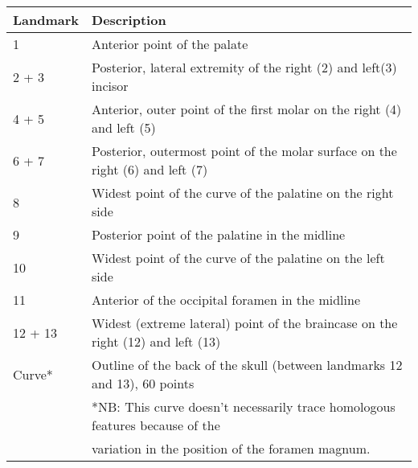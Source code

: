 \begin{tabular}[t]{l l}		
\hline
\textbf{Landmark} & \textbf{Description} \\
\hline
1 & Anterior point of the palate\\
2 + 3 & Posterior, lateral extremity of the right (2) and left(3) incisor\\
4 + 5 & Anterior, outer point of the first molar on the right (4) and left (5)\\
6 + 7 & Posterior, outermost point of the molar surface on the right (6) and left (7) \\
8 & Widest point of the curve of the palatine on the right side\\
9 & Posterior point of the palatine in the midline\\
10 & Widest point of the curve of the palatine on the left side\\
11 & Anterior of the occipital foramen in the midline\\
12 + 13 & Widest (extreme lateral) point of the braincase on the right (12) and left (13)\\
Curve* & Outline of the back of the skull (between landmarks 12 and 13), 60 points \\
\hline
&*NB: This curve doesn't necessarily trace homologous features because of the \\ 
& variation in the position of the foramen magnum.
\end{tabular}